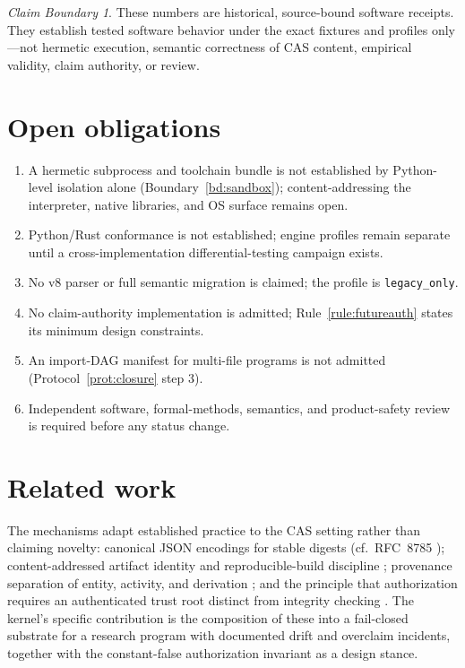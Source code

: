 \documentclass[11pt]{amsart}
\theoremstyle{definition}
\theoremstyle{remark}
\newtheorem{boundary}[theorem]{Claim Boundary}
\begin{document}
\begin{boundary}
These numbers are historical, source-bound software receipts. They establish tested software behavior under the exact fixtures and profiles only---not hermetic execution, semantic correctness of CAS content, empirical validity, claim authority, or review.
\end{boundary}

\section{Open obligations}\label{sec:obligations}

\begin{enumerate}
\item A hermetic subprocess and toolchain bundle is not established by Python-level isolation alone (Boundary~\ref{bd:sandbox}); content-addressing the interpreter, native libraries, and OS surface remains open.
\item Python/Rust conformance is not established; engine profiles remain separate until a cross-implementation differential-testing campaign exists.
\item No v8 parser or full semantic migration is claimed; the profile is \texttt{legacy\_only}.
\item No claim-authority implementation is admitted; Rule~\ref{rule:futureauth} states its minimum design constraints.
\item An import-DAG manifest for multi-file programs is not admitted (Protocol~\ref{prot:closure} step 3).
\item Independent software, formal-methods, semantics, and product-safety review is required before any status change.
\end{enumerate}

\section{Related work}\label{sec:related}

The mechanisms adapt established practice to the CAS setting rather than claiming novelty: canonical JSON encodings for stable digests (cf.\ RFC~8785 \cite{jcs}); content-addressed artifact identity and reproducible-build discipline \cite{reprobuilds}; provenance separation of entity, activity, and derivation \cite{prov}; and the principle that authorization requires an authenticated trust root distinct from integrity checking \cite{anderson}. The kernel's specific contribution is the composition of these into a fail-closed substrate for a research program with documented drift and overclaim incidents, together with the constant-false authorization invariant as a design stance.
\end{document}
